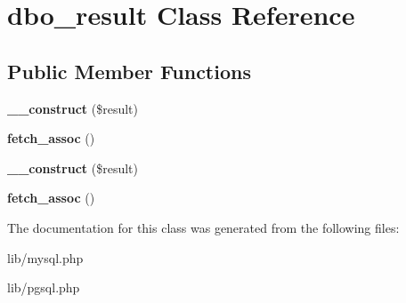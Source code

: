 \hypertarget{classdbo__result}{}\section{dbo\+\_\+result Class Reference}
\label{classdbo__result}
\subsection*{Public Member Functions}
\begin{DoxyCompactItemize}
\item 
\hypertarget{classdbo__result_adf85f6c8d207638032b04ca46c8b20b2}{}{\bfseries \+\_\+\+\_\+construct} (\$result)\label{classdbo__result_adf85f6c8d207638032b04ca46c8b20b2}

\item 
\hypertarget{classdbo__result_a4a5b7f88c22205d6f504ac370f198817}{}{\bfseries fetch\+\_\+assoc} ()\label{classdbo__result_a4a5b7f88c22205d6f504ac370f198817}

\item 
\hypertarget{classdbo__result_adf85f6c8d207638032b04ca46c8b20b2}{}{\bfseries \+\_\+\+\_\+construct} (\$result)\label{classdbo__result_adf85f6c8d207638032b04ca46c8b20b2}

\item 
\hypertarget{classdbo__result_a4a5b7f88c22205d6f504ac370f198817}{}{\bfseries fetch\+\_\+assoc} ()\label{classdbo__result_a4a5b7f88c22205d6f504ac370f198817}

\end{DoxyCompactItemize}


The documentation for this class was generated from the following files\+:\begin{DoxyCompactItemize}
\item 
lib/mysql.\+php\item 
lib/pgsql.\+php\end{DoxyCompactItemize}
